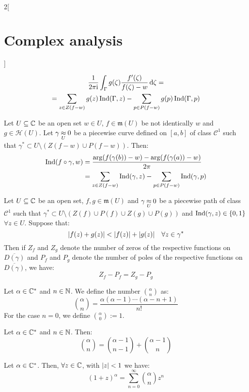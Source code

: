 \documentclass[../../../main_math.tex]{subfiles}
\begin{document}
\begin{multicols}{2}[\section{Complex analysis}]
\begin{theorem}
    \begin{multline*}
      \frac{1}{2\pi\mathrm{i}}\int_{\Gamma}g(\zeta)\frac{f'(\zeta)}{f(\zeta)-w}\dd{\zeta}=\\=\sum_{z\in Z(f-w)}g(z)\operatorname{Ind}(\Gamma,z)-\sum_{p\in P(f-w)}g(p)\operatorname{Ind}(\Gamma,p)
    \end{multline*}
  \end{theorem}
  \begin{corollary}
    Let $U\subseteq \mathbb{C}$ be an open set $w\in U$, $f\in\mathfrak{m}(U)$ be not identically $w$ and $g\in\mathcal{H}(U)$. Let $\gamma\mathbin{\underset{U}{\approx}} 0$ be a piecewise curve defined on $[a,b]$ of class $\mathcal{C}^1$ such that $\gamma^*\subset U\setminus (Z(f-w)\cup P(f-w))$. Then:
    \begin{align*}
      \operatorname{Ind}(f\circ\gamma,w) & =\frac{\arg(f(\gamma(b))-w)-\arg(f(\gamma(a))-w)}{2\pi}            \\
                           & =\sum_{z\in Z(f-w)}\operatorname{Ind}(\gamma,z)-\sum_{p\in P(f-w)}\operatorname{Ind}(\gamma,p)
    \end{align*}
  \end{corollary}
  \begin{theorem}
    Let $U\subseteq \mathbb{C}$ be an open set, $f,g\in\mathfrak{m}(U)$ and $\gamma\mathbin{\underset{U}{\approx}} 0$ be a piecewise path of class $\mathcal{C}^1$ such that $\gamma^*\subset U\setminus (Z(f)\cup P(f)\cup Z(g)\cup P(g))$ and $\operatorname{Ind}(\gamma,z)\in\{0,1\}$ $\forall z\in U$. Suppose that: $$\abs{f(z)+g(z)}<\abs{f(z)}+\abs{g(z)}\quad\forall z\in \gamma^*$$ Then if $Z_f$ and $Z_g$ denote the number of zeros of the respective functions on $\overline{D(\gamma)}$ and $P_f$ and $P_g$ denote the number of poles of the respective functions on $\overline{D(\gamma)}$, we have: $$Z_f-P_f=Z_g-P_g$$
  \end{theorem}
  \begin{definition}
    Let $\alpha\in\mathbb{C}^*$ and $n\in\mathbb{N}$. We define the number $\binom{\alpha}{n}$ as: $$\binom{\alpha}{n}=\frac{\alpha(\alpha-1)\cdots(\alpha-n+1)}{n!}$$ For the case $n=0$, we define $\binom{\alpha}{0}:=1$.
  \end{definition}
  \begin{proposition}
    Let $\alpha\in\mathbb{C}^*$ and $n\in\mathbb{N}$. Then:
    $$\binom{\alpha}{n}=\binom{\alpha-1}{n-1}+\binom{\alpha-1}{n}$$
  \end{proposition}
  \begin{theorem}
    Let $\alpha\in\mathbb{C}^*$. Then, $\forall z\in\mathbb{C}$, with $\abs{z}<1$ we have: $${(1+z)}^\alpha=\sum_{n=0}^\infty\binom{\alpha}{n}z^n$$

\end{theorem}
\end{multicols}
\end{document}
